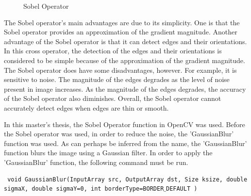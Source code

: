 \begin{figure}[H]
  \centering
  \hfill
  \caption{Sobel Operator\cite{SobelOperatorandCannyEdgeDetector}}
\end{figure} 


The Sobel operator's main advantages are due to its simplicity. One is that the Sobel operator provides an approximation of the gradient magnitude. Another advantage of the Sobel operator is that it can detect edges and their orientations. In this cross operator, the detection of the edges and their orientations is considered to be simple because of the approximation of the gradient magnitude. The Sobel operator does have some disadvantages, however. For example, it is sensitive to noise. The magnitude of the edges degrades as the level of noise present in image increases. As the magnitude of the edges degrades, the accuracy of the Sobel operator also diminishes. Overall, the Sobel operator cannot accurately detect edges when edges are thin or smooth.



In this master's thesis, the Sobel Operator function in OpenCV was used. Before the Sobel operator was used, in order to reduce the noise, the 'GaussianBlur' function was used. As can perhaps be inferred from the name, the 'GaussianBlur' function blurs the image using a Gaussian filter. In order to apply the 'GaussianBlur' function, the following command must be run.

 \begin{center}
  
\texttt{ void GaussianBlur(InputArray src, OutputArray dst, Size ksize, double sigmaX, double sigmaY=0, int borderType=BORDER$\_$DEFAULT )}

  \end{center}

